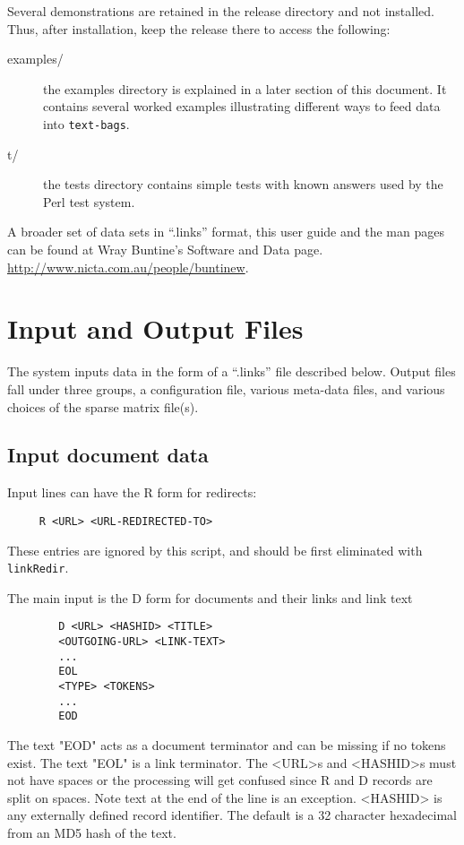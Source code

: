 \documentclass{article}
\begin{document}
Several demonstrations are retained in the
release directory and not installed.
Thus, after installation, keep the release there to access the following:
\begin{description}
\item[examples/]
the examples directory is explained in a later section of this document.
It contains several worked examples illustrating different ways to
feed data into {\tt text-bags}.
\item[t/]
the tests directory contains simple tests with known answers
used by the Perl test system.
\end{description}

A broader set of data sets in ``.links'' format,
this user guide and the man pages can be found at Wray Buntine's
Software and Data page.
\url{http://www.nicta.com.au/people/buntinew}.

\section{Input and Output Files}

The system inputs data in the form of a ``.links'' file described below.
Output files fall under three groups,
a configuration file, various meta-data files, 
and various choices of the sparse matrix file(s).

\subsection{Input document data}
\label{ssct_input}

Input lines can have the R form for redirects:
\begin{verbatim}
     R <URL> <URL-REDIRECTED-TO>
\end{verbatim}
These entries are ignored by this script, and should be first
eliminated with {\tt linkRedir}.

The main input is the
D form for documents and their links and link text
\begin{verbatim}
        D <URL> <HASHID> <TITLE>
        <OUTGOING-URL> <LINK-TEXT>
        ...
        EOL
        <TYPE> <TOKENS>
        ...
        EOD
\end{verbatim}

The text "EOD" acts as a
document terminator and can be missing if no tokens exist.
The text "EOL" is a link terminator.  The <URL>s and <HASHID>s must not have
spaces or the processing will get confused since R and D records are
split on spaces.   Note text at the end of the line is an exception.
<HASHID> is any externally defined record identifier.  The default
is a 32 character hexadecimal from an MD5 hash of the text.
\end{document}
